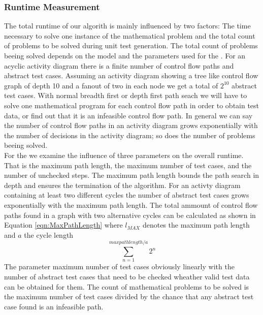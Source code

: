 \subsubsection{Runtime Measurement}
The total runtime of our algorith is mainly influenced by two factors: The time necessary to solve one instance of the mathematical problem and the total count of problems to be solved during unit test generation. The total count of problems beeing solved depends on the model and the parameters used for the . For an acyclic activity diagram there is a finite number of control flow paths and abstract test cases. Assuming an activity diagram showing a tree like control flow graph of depth 10 and a fanout of two in each node we get a total of $2^{10}$ abstract test cases. With normal breadth first or depth first path seach we will have to solve one mathematical program for each control flow path in order to obtain test data, or find out that it is an infeasible control flow path. In general we can say the number of control flow paths in an activity diagram grows exponentially with the number of decisions in the activity diagram; so does the number of problems beeing solved.\\
For the  we examine the influence of three parameters on the overall runtime. That is the maximum path length, the maximum number of test cases, and the number of unchecked steps. The maximum path length bounds the path search in depth and ensures the termination of the algorithm. For an activty diagram containing at least two different cycles the number of abstract test cases grows exponentially with the maximum path length. %
The total ammount of control flow paths found in a graph with two alternative cycles can be calculated as shown in Equation \ref{eqn:MaxPathLength} where $l_{MAX}$ denotes the maximum path length and $a$ the cycle length
\begin{equation}\sum_{n=1}^{max path length/a}{2^n}\label{eqn:MaxPathLength}\end{equation}
The parameter maximum number of test cases obviously linearly with the number of abstract test cases that need to be checked wheather valid test data can be obtained for them. The count of mathematical problems to be solved is the maximum number of test cases divided by the chance that any abstract test case found is an infeasible path. 
